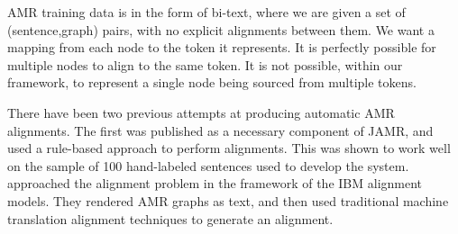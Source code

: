 
AMR training data is in the form of bi-text, where we are given a set of
  (sentence,graph) pairs, with no explicit alignments between them.
We want a mapping from each node to the token it represents. It is perfectly possible for multiple nodes to align to the same token. It is not possible, within our framework, to represent a single node being sourced from multiple tokens.




There have been two previous attempts at producing automatic AMR alignments. 
The first was published as a necessary component of JAMR, 
  and used a rule-based approach to perform alignments.
This was shown to work well on the sample of 100 hand-labeled sentences used to 
  develop the system.
 approached the alignment problem in 
  the framework of the IBM alignment models.
They rendered AMR graphs as text, and then used traditional machine translation 
  alignment techniques to generate an alignment.

